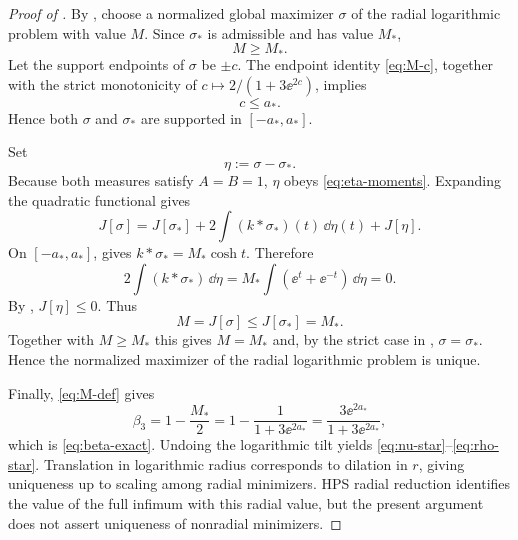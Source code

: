 \begin{proof}[Proof of ]
By , choose a normalized global maximizer $\sigma$ of the radial logarithmic problem with value $M$.  Since $\sigma_*$ is admissible and has value $M_*$,
\[
 M\ge M_*.
\]
Let the support endpoints of $\sigma$ be $\pm c$.  The endpoint identity \eqref{eq:M-c}, together with the strict monotonicity of $c\mapsto2/(1+3\ee^{2c})$, implies
\[
 c\le a_*.
\]
Hence both $\sigma$ and $\sigma_*$ are supported in $[-a_*,a_*]$.

Set
\[
 \eta:=\sigma-\sigma_*.
\]
Because both measures satisfy $A=B=1$, $\eta$ obeys \eqref{eq:eta-moments}.  Expanding the quadratic functional gives
\[
 J[\sigma]
 =J[\sigma_*]
 +2\int(k*\sigma_*)(t)\,\dd\eta(t)
 +J[\eta].
\]
On $[-a_*,a_*]$,  gives $k*\sigma_*=M_*\cosh t$.  Therefore
\[
 2\int(k*\sigma_*)\,\dd\eta
 =M_*\int(\ee^t+\ee^{-t})\,\dd\eta=0.
\]
By , $J[\eta]\le0$.  Thus
\[
 M=J[\sigma]\le J[\sigma_*]=M_*.
\]
Together with $M\ge M_*$ this gives $M=M_*$ and, by the strict case in , $\sigma=\sigma_*$.  Hence the normalized maximizer of the radial logarithmic problem is unique.

Finally, \eqref{eq:M-def} gives
\[
 \beta_3
 =1-\frac{M_*}{2}
 =1-\frac1{1+3\ee^{2a_*}}
 =\frac{3\ee^{2a_*}}{1+3\ee^{2a_*}},
\]
which is \eqref{eq:beta-exact}.  Undoing the logarithmic tilt yields \eqref{eq:nu-star}--\eqref{eq:rho-star}.  Translation in logarithmic radius corresponds to dilation in $r$, giving uniqueness up to scaling among radial minimizers.  HPS radial reduction identifies the value of the full infimum with this radial value, but the present argument does not assert uniqueness of nonradial minimizers.
\end{proof}
